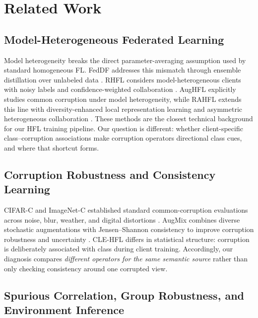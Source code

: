\section{Related Work}

\subsection{Model-Heterogeneous Federated Learning}

Model heterogeneity breaks the direct parameter-averaging assumption used by standard homogeneous FL. FedDF addresses this mismatch through ensemble distillation over unlabeled data \citep{lin2020feddf}. RHFL considers model-heterogeneous clients with noisy labels and confidence-weighted collaboration \citep{fang2022rhfl}. AugHFL explicitly studies common corruption under model heterogeneity, while RAHFL extends this line with diversity-enhanced local representation learning and asymmetric heterogeneous collaboration \citep{fang2023aughfl,fang2025rahfl}. These methods are the closest technical background for our HFL training pipeline. Our question is different: whether client-specific class--corruption associations make corruption operators directional class cues, and where that shortcut forms.

\subsection{Corruption Robustness and Consistency Learning}

CIFAR-C and ImageNet-C established standard common-corruption evaluations across noise, blur, weather, and digital distortions \citep{hendrycks2019corruptions}. AugMix combines diverse stochastic augmentations with Jensen--Shannon consistency to improve corruption robustness and uncertainty \citep{cubuk2020augmix}. CLE-HFL differs in statistical structure: corruption is deliberately associated with class during client training. Accordingly, our diagnosis compares \emph{different operators for the same semantic source} rather than only checking consistency around one corrupted view.

\subsection{Spurious Correlation, Group Robustness, and Environment Inference}

